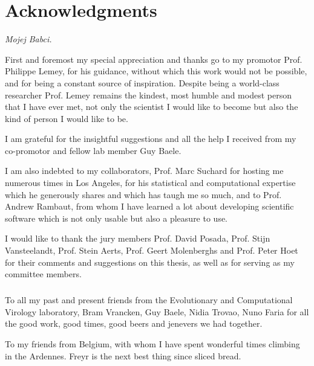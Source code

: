 
\chapter*{Acknowledgments}


\medskip{}

\begin{flushright}
\emph{Mojej Babci.}
\par\end{flushright}

\medskip{}

First and foremost my special appreciation and thanks go to my promotor Prof. Philippe Lemey, for his guidance, without which this work would not be possible, and for being a constant source of inspiration. 
Despite being a world-class researcher Prof. Lemey remains the kindest, most humble and modest person that I have ever met, not only the scientist I would like to become but also the kind of person I would like to
be.

I am grateful for the insightful suggestions and all the help I received from my co-promotor and fellow lab member Guy Baele.

I am also indebted to my collaborators, Prof. Marc Suchard for hosting me numerous times in Los Angeles, for his statistical and computational expertise which he generously shares and which has taugh me so much, and to Prof. Andrew Rambaut, from whom I have learned a lot about developing scientific software which is not only usable but also a pleasure to use.

I would like to thank the jury members Prof. David Posada, Prof. Stijn Vansteelandt, Prof. Stein Aerts, Prof. Geert Molenberghs and Prof. Peter Hoet for their comments and suggestions on this thesis, as well as for serving as my committee members.

\paragraph{} 
To all my past and present friends from the Evolutionary and Computational Virology laboratory, Bram Vrancken, Guy Baele, Nidia Trovao, Nuno Faria for all the good work, good times, good beers and jenevers we had together.

To my friends from Belgium, with whom I have spent wonderful times climbing in the Ardennes. 
Freyr is the next best thing since sliced bread.

